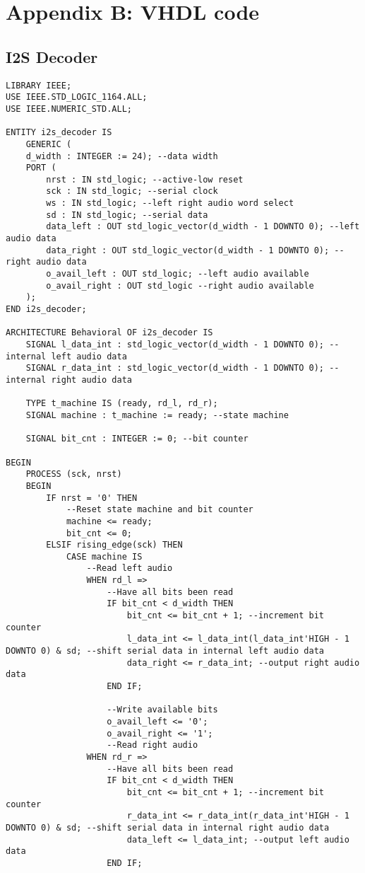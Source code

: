 \chapter*{Appendix B: VHDL code}
\label{chap:appendix-B-vhdl}

\section*{I2S Decoder}
\begin{lstlisting}
LIBRARY IEEE;
USE IEEE.STD_LOGIC_1164.ALL;
USE IEEE.NUMERIC_STD.ALL;

ENTITY i2s_decoder IS
	GENERIC (
	d_width : INTEGER := 24); --data width
	PORT (
		nrst : IN std_logic; --active-low reset
		sck : IN std_logic; --serial clock
		ws : IN std_logic; --left right audio word select
		sd : IN std_logic; --serial data
		data_left : OUT std_logic_vector(d_width - 1 DOWNTO 0); --left audio data
		data_right : OUT std_logic_vector(d_width - 1 DOWNTO 0); --right audio data
		o_avail_left : OUT std_logic; --left audio available
		o_avail_right : OUT std_logic --right audio available
	); 
END i2s_decoder;

ARCHITECTURE Behavioral OF i2s_decoder IS
	SIGNAL l_data_int : std_logic_vector(d_width - 1 DOWNTO 0); --internal left audio data
	SIGNAL r_data_int : std_logic_vector(d_width - 1 DOWNTO 0); --internal right audio data

	TYPE t_machine IS (ready, rd_l, rd_r);
	SIGNAL machine : t_machine := ready; --state machine

	SIGNAL bit_cnt : INTEGER := 0; --bit counter

BEGIN
	PROCESS (sck, nrst)
	BEGIN
		IF nrst = '0' THEN
			--Reset state machine and bit counter
			machine <= ready;
			bit_cnt <= 0;
		ELSIF rising_edge(sck) THEN
			CASE machine IS
				--Read left audio
				WHEN rd_l => 
					--Have all bits been read
					IF bit_cnt < d_width THEN
						bit_cnt <= bit_cnt + 1; --increment bit counter
						l_data_int <= l_data_int(l_data_int'HIGH - 1 DOWNTO 0) & sd; --shift serial data in internal left audio data
						data_right <= r_data_int; --output right audio data
					END IF;

					--Write available bits
					o_avail_left <= '0';
					o_avail_right <= '1';
					--Read right audio
				WHEN rd_r => 
					--Have all bits been read
					IF bit_cnt < d_width THEN
						bit_cnt <= bit_cnt + 1; --increment bit counter
						r_data_int <= r_data_int(r_data_int'HIGH - 1 DOWNTO 0) & sd; --shift serial data in internal right audio data
						data_left <= l_data_int; --output left audio data
					END IF;


\end{lstlisting}
